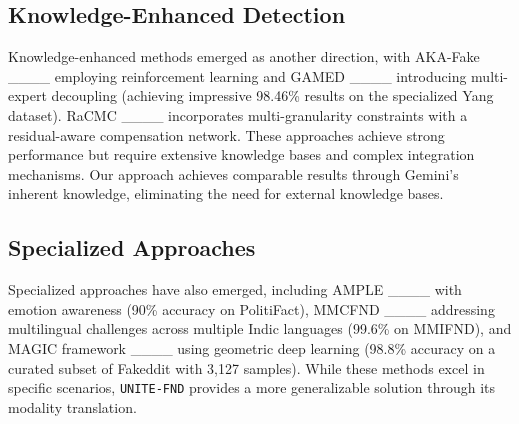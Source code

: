 \subsection{Knowledge-Enhanced Detection}
Knowledge-enhanced methods emerged as another direction, with AKA-Fake ____ employing reinforcement learning and GAMED ____ introducing multi-expert decoupling (achieving impressive 98.46\% results on the specialized Yang dataset). RaCMC ____ incorporates multi-granularity constraints with a residual-aware compensation network. These approaches achieve strong performance but require extensive knowledge bases and complex integration mechanisms. Our approach achieves comparable results through Gemini's inherent knowledge, eliminating the need for external knowledge bases.

\subsection{Specialized Approaches}
Specialized approaches have also emerged, including AMPLE ____ with emotion awareness (90\% accuracy on PolitiFact), MMCFND ____ addressing multilingual challenges across multiple Indic languages (99.6\% on MMIFND), and MAGIC framework ____ using geometric deep learning (98.8\% accuracy on a curated subset of Fakeddit with 3,127 samples).  While these methods excel in specific scenarios, \texttt{UNITE-FND} provides a more generalizable solution through its modality translation.